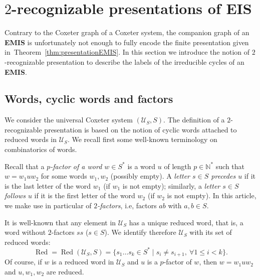 \documentclass[A4paper, oneside]{amsart}
\newcommand{\Red}{\operatorname{Red}}
\newcommand{\U}{\mathcal{U}}
\newcommand{\EIS}{\textnormal{\bf EIS}\xspace}
\newcommand{\EMIS}{\textnormal{\bf EMIS}\xspace}
\theoremstyle{definition}
\begin{document}
\section{$2$-recognizable presentations of \EIS}
\label{se:2recognizable}

Contrary to the Coxeter graph of a Coxeter system, the companion graph of an \EMIS is unfortunately not enough to fully encode the  finite presentation given in~Theorem~\ref{thm:presentationEMIS}. In this section we introduce the notion of $2$-recognizable presentation to describe the labels of the irreducible  cycles of an \EMIS. 

\subsection{Words, cyclic words and factors}   
\label{ss:CyclicWords}

We consider the universal Coxeter system $(\U_S,S)$. The definition of a $2$-recognizable presentation is based on the notion of  cyclic words attached to  reduced words in $\U_S$. We recall first some well-known terminology on combinatorics of words. 

Recall that a {\em $p$-factor of a word $w\in S^*$} is a word $u$ of length $p\in\mathbb N^*$ such that $w=w_1uw_2$ for some words $w_1,w_2$ (possibly empty). A {\em letter $s\in S$ precedes $u$} if it is the last letter of the word $w_1$ (if $w_1$ is not empty); similarly, a {\em letter $s\in S$ follows $u$} if it is the first letter of the word $w_2$ (if $w_2$ is not empty).  In this article, we make use in particular of {\em $2$-factors}, i.e, factors $ab$ with $a,b\in S$. 

It is well-known that any element in $\U_S$ has a unique reduced word, that is, a word without $2$-factors $ss$ ($s\in S$). We identify therefore $\U_S$ with its set of reduced words:
$$
\Red=\Red(\U_S,S)=\{s_1\dots s_k\in S^*\mid s_i\not = s_{i+1}, \ \forall 1\leq i<k\}.
$$
Of course, if $w$ is a reduced word in $\U_S$ and $u$ is a $p$-factor of $w$, then  $w=w_1uw_2$ and  $u,w_1,w_2$ are reduced. 
 
\end{document}

